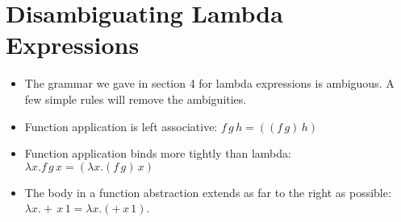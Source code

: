 \documentclass[]{article}
\begin{document}
\section{Disambiguating Lambda Expressions}
\begin{itemize}
\item The grammar we gave in section 4 for lambda expressions is ambiguous. A few simple rules will remove the ambiguities.
\item Function application is left associative: $f\,g\,h = ((f\,g)\,h)$
\item Function application binds more tightly than lambda: $\lambda x.f\,g\,x = (\lambda x.(f\,g)\,x)$
\item The body in a function abstraction extends as far to the right as possible: $\lambda x.+\,x\,1=\lambda x.(+\,x\,1)$.
\end{itemize}
\end{document}
